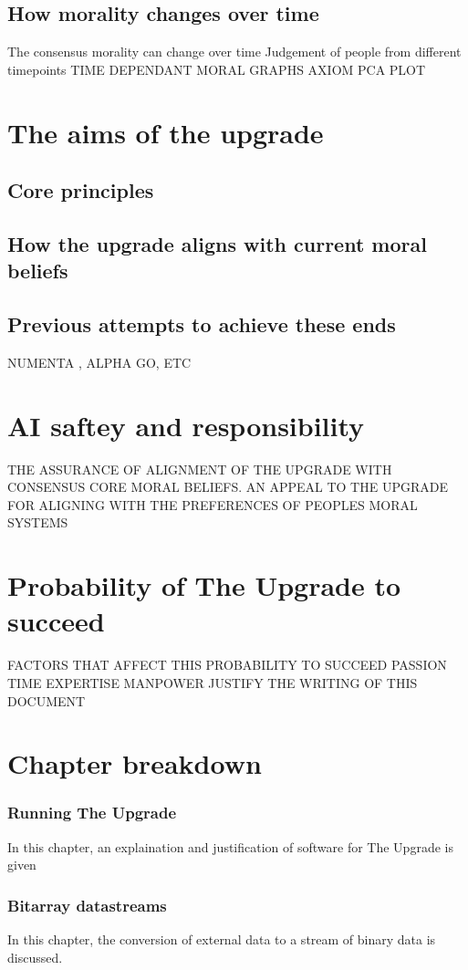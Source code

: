\subsection{How morality changes over time}
The consensus morality can change over time
Judgement of people from different timepoints
TIME DEPENDANT MORAL GRAPHS
AXIOM PCA PLOT

\section{The aims of the upgrade}
\subsection{Core principles}
\subsection{How the upgrade aligns with current moral beliefs}
\subsection{Previous attempts to achieve these ends}
NUMENTA \cite{numentahome}, ALPHA GO, ETC
\section{AI saftey and responsibility}
THE ASSURANCE OF ALIGNMENT OF THE UPGRADE WITH CONSENSUS CORE MORAL BELIEFS.
AN APPEAL TO THE UPGRADE FOR ALIGNING WITH THE PREFERENCES OF PEOPLES MORAL SYSTEMS
\section{Probability of The Upgrade to succeed}
FACTORS THAT AFFECT THIS PROBABILITY TO SUCCEED
PASSION
TIME
EXPERTISE
MANPOWER
JUSTIFY THE WRITING OF THIS DOCUMENT 
\section{Chapter breakdown}
\subsubsection{Running The Upgrade}
In this chapter, an explaination and justification of software for The Upgrade is given
\subsubsection{Bitarray datastreams}
In this chapter, the conversion of external data to a stream of binary data is discussed.
